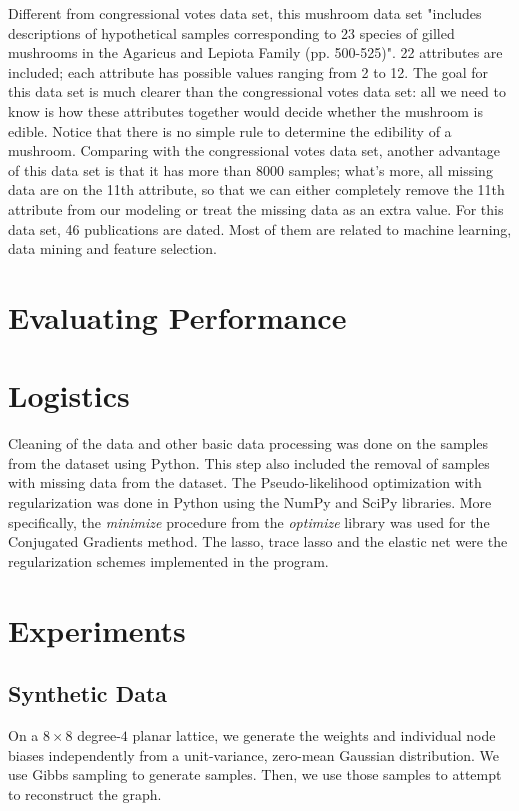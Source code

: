 \documentclass[11pt]{article}
\begin{document}
Different from congressional votes data set, this mushroom data set "includes descriptions of hypothetical samples corresponding to 23 species of gilled mushrooms in the Agaricus and Lepiota Family (pp. 500-525)". 22 attributes are included; each attribute has possible values ranging from 2 to 12. The goal for this data set is much clearer than the congressional votes data set: all we need to know is how these attributes together would decide whether the mushroom is edible. Notice that there is no simple rule to determine the edibility of a mushroom. Comparing with the congressional votes data set, another advantage of this data set is that it has more than 8000 samples; what's more, all missing data are on the 11th attribute, so that we can either completely remove the 11th attribute from our modeling or treat the missing data as an extra value. For this data set, 46 publications are dated. Most of them are related to machine learning, data mining and feature selection.

\section{Evaluating Performance}
\section{Logistics}

Cleaning of the data and other basic data processing was done on the samples from the dataset using Python. This step also included the removal of samples with missing data from the dataset. 
The Pseudo-likelihood optimization with regularization was done in Python using the NumPy and SciPy libraries. 
More specifically, the \textit{minimize} procedure from the \textit{optimize} library was used for the Conjugated Gradients method. 
The lasso, trace lasso and the elastic net were the regularization schemes implemented in the program. 

\section{Experiments}
\subsection{Synthetic Data}
On a $8\times8$ degree-$4$ planar lattice, we generate the weights and individual node biases independently from a unit-variance, zero-mean Gaussian distribution.  We use Gibbs sampling to generate samples.  Then, we use those samples to attempt to reconstruct the graph. 
\end{document}
